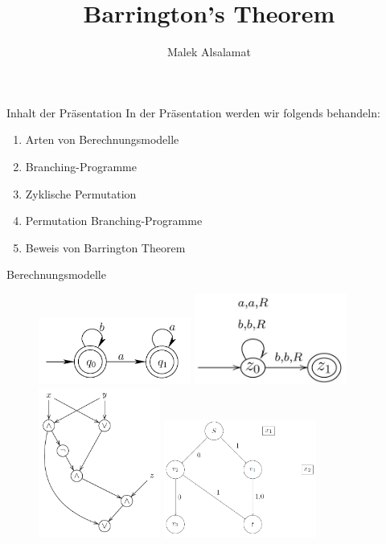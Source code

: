 \documentclass{beamer}
\title{Barrington's Theorem}
\author{Malek Alsalamat}
\institute{Universität Kassel}
\begin{document}
\begin{frame}
\titlepage
\end{frame}

\begin{frame}{Inhalt der Präsentation}
In der Präsentation werden wir folgends behandeln: \\[7pt]
\begin{enumerate}
\item Arten von Berechnungsmodelle \\[7pt]
\item Branching-Programme \\[7pt]
\item Zyklische Permutation \\[7pt]
\item Permutation Branching-Programme \\[7pt]
\item Beweis von Barrington Theorem
\end{enumerate}
\end{frame}


\begin{frame}{Berechnungsmodelle}
\begin{figure}[h]
\begin{center}
\includegraphics[width=5cm]{NFA.png}
\includegraphics[width=5cm]{TM.jpg}
\includegraphics[width=4cm]{DeMorgan_formel.png}
\includegraphics[width=5cm]{BP.png}
\end{center}
\end{figure}
\end{frame}
\end{document}
